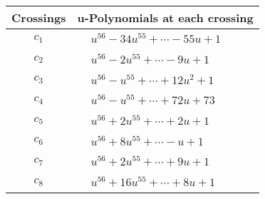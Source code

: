 \documentclass[1p]{elsarticle_modified}
\theoremstyle{definition}
\begin{document}
\begin{tabular}{m{50pt}|m{274pt}}
Crossings & \hspace{64pt}u-Polynomials at each crossing \\
\hline $$\begin{aligned}c_{1}\end{aligned}$$&$\begin{aligned}
&u^{56}-34 u^{55}+\cdots-55 u+1
\end{aligned}$\\
\hline $$\begin{aligned}c_{2}\end{aligned}$$&$\begin{aligned}
&u^{56}-2 u^{55}+\cdots-9 u+1
\end{aligned}$\\
\hline $$\begin{aligned}c_{3}\end{aligned}$$&$\begin{aligned}
&u^{56}- u^{55}+\cdots+12 u^2+1
\end{aligned}$\\
\hline $$\begin{aligned}c_{4}\end{aligned}$$&$\begin{aligned}
&u^{56}- u^{55}+\cdots+72 u+73
\end{aligned}$\\
\hline $$\begin{aligned}c_{5}\end{aligned}$$&$\begin{aligned}
&u^{56}+2 u^{55}+\cdots+2 u+1
\end{aligned}$\\
\hline $$\begin{aligned}c_{6}\end{aligned}$$&$\begin{aligned}
&u^{56}+8 u^{55}+\cdots- u+1
\end{aligned}$\\
\hline $$\begin{aligned}c_{7}\end{aligned}$$&$\begin{aligned}
&u^{56}+2 u^{55}+\cdots+9 u+1
\end{aligned}$\\
\hline $$\begin{aligned}c_{8}\end{aligned}$$&$\begin{aligned}
&u^{56}+16 u^{55}+\cdots+8 u+1
\end{aligned}$\\

\end{tabular}
\end{document}
